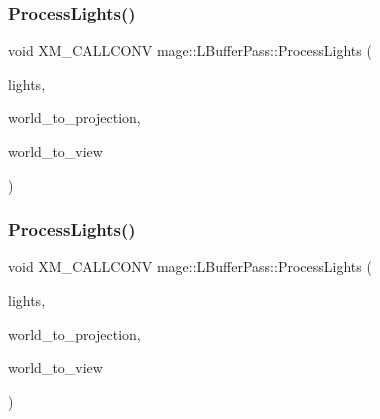 \subsubsection{\texorpdfstring{Process\+Lights()}{ProcessLights()}\hspace{0.1cm}{\footnotesize\ttfamily [2/3]}}
{\footnotesize\ttfamily void X\+M\+\_\+\+C\+A\+L\+L\+C\+O\+NV mage\+::\+L\+Buffer\+Pass\+::\+Process\+Lights (\begin{DoxyParamCaption}\item[{const vector$<$ const \hyperlink{namespacemage_a1724c6e6b6b5ba535cdd967cbbb4a669}{Omni\+Light\+Node} $\ast$ $>$ \&}]{lights,  }\item[{F\+X\+M\+M\+A\+T\+R\+IX}]{world\+\_\+to\+\_\+projection,  }\item[{C\+X\+M\+M\+A\+T\+R\+IX}]{world\+\_\+to\+\_\+view }\end{DoxyParamCaption})\hspace{0.3cm}{\ttfamily [private]}}

\hypertarget{structmage_1_1_l_buffer_pass_ab3b4271e8a852f79fd6ff089463acf44}{}\label{structmage_1_1_l_buffer_pass_ab3b4271e8a852f79fd6ff089463acf44} 
\subsubsection{\texorpdfstring{Process\+Lights()}{ProcessLights()}\hspace{0.1cm}{\footnotesize\ttfamily [3/3]}}
{\footnotesize\ttfamily void X\+M\+\_\+\+C\+A\+L\+L\+C\+O\+NV mage\+::\+L\+Buffer\+Pass\+::\+Process\+Lights (\begin{DoxyParamCaption}\item[{const vector$<$ const \hyperlink{namespacemage_aeed5dee4ff6c591eabb0e9114256df4a}{Spot\+Light\+Node} $\ast$ $>$ \&}]{lights,  }\item[{F\+X\+M\+M\+A\+T\+R\+IX}]{world\+\_\+to\+\_\+projection,  }\item[{C\+X\+M\+M\+A\+T\+R\+IX}]{world\+\_\+to\+\_\+view }\end{DoxyParamCaption})\hspace{0.3cm}{\ttfamily [private]}}

\hypertarget{structmage_1_1_l_buffer_pass_a4c83abfabfa8a144cab5d238045635f8}{}\label{structmage_1_1_l_buffer_pass_a4c83abfabfa8a144cab5d238045635f8} 
